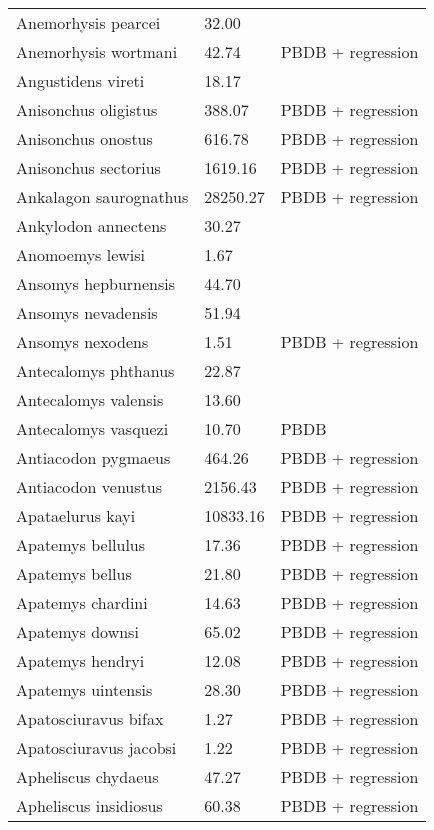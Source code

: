 \documentclass{article}
\begin{document}
\begin{center}
\begin{longtable}{p{} p{} p{}}
    Anemorhysis pearcei & 32.00 & \cite{Albright2000} \\ 
    Anemorhysis wortmani & 42.74 & PBDB + regression \\ 
    Angustidens vireti & 18.17 & \cite{Tomiya2013} \\ 
    Anisonchus oligistus & 388.07 & PBDB + regression \\ 
    Anisonchus onostus & 616.78 & PBDB + regression \\ 
    Anisonchus sectorius & 1619.16 & PBDB + regression \\ 
    Ankalagon saurognathus & 28250.27 & PBDB + regression \\ 
    Ankylodon annectens & 30.27 & \cite{Tomiya2013} \\ 
    Anomoemys lewisi & 1.67 & \cite{Simons1960} \\ 
    Ansomys hepburnensis & 44.70 & \cite{Tomiya2013} \\ 
    Ansomys nevadensis & 51.94 & \cite{Tomiya2013} \\ 
    Ansomys nexodens & 1.51 & PBDB + regression \\ 
    Antecalomys phthanus & 22.87 & \cite{Tomiya2013} \\ 
    Antecalomys valensis & 13.60 & \cite{Tomiya2013} \\ 
    Antecalomys vasquezi & 10.70 & PBDB \\ 
    Antiacodon pygmaeus & 464.26 & PBDB + regression \\ 
    Antiacodon venustus & 2156.43 & PBDB + regression \\ 
    Apataelurus kayi & 10833.16 & PBDB + regression \\ 
    Apatemys bellulus & 17.36 & PBDB + regression \\ 
    Apatemys bellus & 21.80 & PBDB + regression \\ 
    Apatemys chardini & 14.63 & PBDB + regression \\ 
    Apatemys downsi & 65.02 & PBDB + regression \\ 
    Apatemys hendryi & 12.08 & PBDB + regression \\ 
    Apatemys uintensis & 28.30 & PBDB + regression \\ 
    Apatosciuravus bifax & 1.27 & PBDB + regression \\ 
    Apatosciuravus jacobsi & 1.22 & PBDB + regression \\ 
    Apheliscus chydaeus & 47.27 & PBDB + regression \\ 
    Apheliscus insidiosus & 60.38 & PBDB + regression \\ 

\end{longtable}
\end{center}
\end{document}

